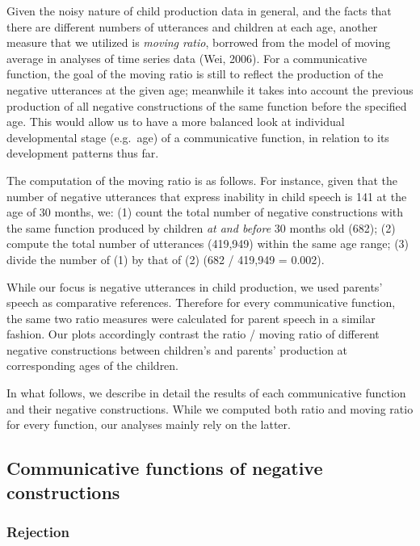 \documentclass[10pt, letterpaper]{article}
\begin{document}
Given the noisy nature of child production data in general, and the
facts that there are different numbers of utterances and children at
each age, another measure that we utilized is \emph{moving ratio},
borrowed from the model of moving average in analyses of time series
data (Wei, 2006). For a communicative function, the goal of the moving
ratio is still to reflect the production of the negative utterances at
the given age; meanwhile it takes into account the previous production
of all negative constructions of the same function before the specified
age. This would allow us to have a more balanced look at individual
developmental stage (e.g.~age) of a communicative function, in relation
to its development patterns thus far.

The computation of the moving ratio is as follows. For instance, given
that the number of negative utterances that express inability in child
speech is 141 at the age of 30 months, we: (1) count the total number of
negative constructions with the same function produced by children
\emph{at and before} 30 months old (682); (2) compute the total number
of utterances (419,949) within the same age range; (3) divide the number
of (1) by that of (2) (682 / 419,949 = 0.002).

While our focus is negative utterances in child production, we used
parents' speech as comparative references. Therefore for every
communicative function, the same two ratio measures were calculated for
parent speech in a similar fashion. Our plots accordingly contrast the
ratio / moving ratio of different negative constructions between
children's and parents' production at corresponding ages of the
children.

In what follows, we describe in detail the results of each communicative
function and their negative constructions. While we computed both ratio
and moving ratio for every function, our analyses mainly rely on the
latter.

\hypertarget{communicative-functions-of-negative-constructions}{%
\subsection{Communicative functions of negative
constructions}\label{communicative-functions-of-negative-constructions}}

\hypertarget{rejection}{%
\subsubsection{Rejection}\label{rejection}}
\end{document}
